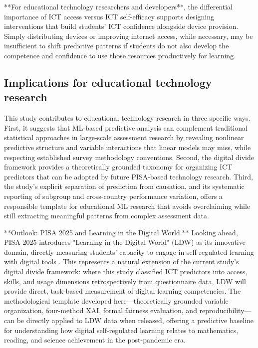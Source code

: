\documentclass[pdflatex,sn-mathphys-ay]{sn-jnl}
\begin{document}
**For educational technology researchers and developers**, the differential importance of ICT access versus ICT self-efficacy supports designing interventions that build students' ICT confidence alongside device provision. Simply distributing devices or improving internet access, while necessary, may be insufficient to shift predictive patterns if students do not also develop the competence and confidence to use those resources productively for learning.

\FloatBarrier
\subsection{Implications for educational technology research}

This study contributes to educational technology research in three specific ways. First, it suggests that ML-based predictive analysis can complement traditional statistical approaches in large-scale assessment research by revealing nonlinear predictive structure and variable interactions that linear models may miss, while respecting established survey methodology conventions. Second, the digital divide framework provides a theoretically grounded taxonomy for organizing ICT predictors that can be adopted by future PISA-based technology research. Third, the study's explicit separation of prediction from causation, and its systematic reporting of subgroup and cross-country performance variation, offers a responsible template for educational ML research that avoids overclaiming while still extracting meaningful patterns from complex assessment data.

**Outlook: PISA 2025 and Learning in the Digital World.** Looking ahead, PISA 2025 introduces "Learning in the Digital World" (LDW) as its innovative domain, directly measuring students' capacity to engage in self-regulated learning with digital tools \citep{OECD_2025_LDW}. This represents a natural extension of the current study's digital divide framework: where this study classified ICT predictors into access, skills, and usage dimensions retrospectively from questionnaire data, LDW will provide direct, task-based measurement of digital learning competencies. The methodological template developed here---theoretically grounded variable organization, four-method XAI, formal fairness evaluation, and reproducibility---can be directly applied to LDW data when released, offering a predictive baseline for understanding how digital self-regulated learning relates to mathematics, reading, and science achievement in the post-pandemic era.
\end{document}
